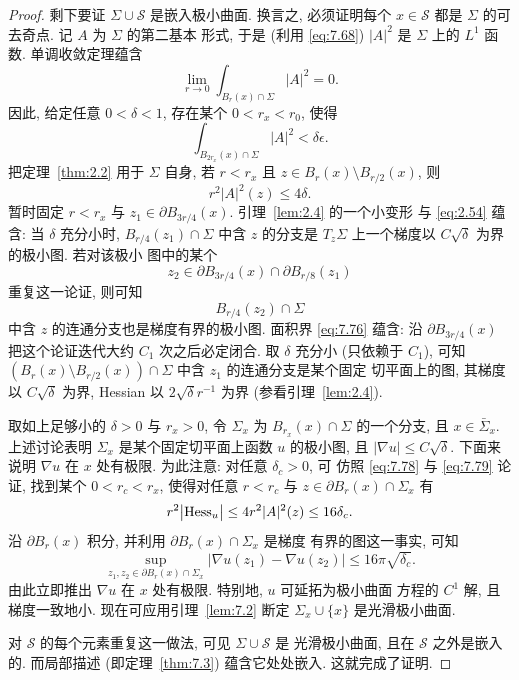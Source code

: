 \begin{proof}
剩下要证 $\Sigma\cup\mathcal{S}$ 是嵌入极小曲面. 换言之, 必须证明每个
$x\in\mathcal{S}$ 都是 $\Sigma$ 的可去奇点. 记 $A$ 为 $\Sigma$ 的第二基本
形式, 于是 (利用 \eqref{eq:7.68}) $|A|^2$ 是 $\Sigma$ 上的 $L^1$ 函数.
单调收敛定理蕴含
\begin{equation}
\lim_{r\to0}\int_{B_r(x)\cap\Sigma}|A|^2=0.
\label{eq:7.77}
\end{equation}
因此, 给定任意 $0<\delta<1$, 存在某个 $0<r_x<r_0$, 使得
\begin{equation}
\int_{B_{2r_x}(x)\cap\Sigma}|A|^2<\delta\epsilon.
\label{eq:7.78}
\end{equation}
把定理~\ref{thm:2.2} 用于 $\Sigma$ 自身, 若 $r<r_x$ 且
$z\in B_r(x)\setminus B_{r/2}(x)$, 则
\begin{equation}
r^2|A|^2(z)\leq4\delta.
\label{eq:7.79}
\end{equation}
暂时固定 $r<r_x$ 与 $z_1\in\partial B_{3r/4}(x)$. 引理~\ref{lem:2.4} 的一个小变形
与 \eqref{eq:2.54} 蕴含: 当 $\delta$ 充分小时, $B_{r/4}(z_1)\cap\Sigma$ 中含 $z$
的分支是 $T_z\Sigma$ 上一个梯度以 $C\sqrt\delta$ 为界的极小图. 若对该极小
图中的某个
\[
z_2\in\partial B_{3r/4}(x)\cap\partial B_{r/8}(z_1)
\]
重复这一论证, 则可知
\[
B_{r/4}(z_2)\cap\Sigma
\]
中含 $z$ 的连通分支也是梯度有界的极小图. 面积界 \eqref{eq:7.76} 蕴含:
沿 $\partial B_{3r/4}(x)$ 把这个论证迭代大约 $C_1$ 次之后必定闭合. 取
$\delta$ 充分小 (只依赖于 $C_1$), 可知
$(B_r(x)\setminus B_{r/2}(x))\cap\Sigma$ 中含 $z_1$ 的连通分支是某个固定
切平面上的图, 其梯度以 $C\sqrt\delta$ 为界, Hessian 以 $2\sqrt\delta r^{-1}$
为界 (参看引理~\ref{lem:2.4}).

取如上足够小的 $\delta>0$ 与 $r_x>0$, 令 $\Sigma_x$ 为
$B_{r_x}(x)\cap\Sigma$ 的一个分支, 且 $x\in\bar\Sigma_x$. 上述讨论表明
$\Sigma_x$ 是某个固定切平面上函数 $u$ 的极小图, 且 $|\nabla u|\leq C\sqrt\delta$.
下面来说明 $\nabla u$ 在 $x$ 处有极限. 为此注意: 对任意 $\delta_c>0$, 可
仿照 \eqref{eq:7.78} 与 \eqref{eq:7.79} 论证, 找到某个 $0<r_c<r_x$,
使得对任意 $r<r_c$ 与 $z\in\partial B_r(x)\cap\Sigma_x$ 有
\begin{equation}
r^2\bigl|\operatorname{Hess}_u\bigr|\leq4r^2|A|^2(z)\leq16\delta_c.
\label{eq:7.80}
\end{equation}
沿 $\partial B_r(x)$ 积分, 并利用 $\partial B_r(x)\cap\Sigma_x$ 是梯度
有界的图这一事实, 可知
\begin{equation}
\sup_{z_1,z_2\in\partial B_r(x)\cap\Sigma_x}
|\nabla u(z_1)-\nabla u(z_2)|\leq16\pi\sqrt{\delta_c}.
\label{eq:7.81}
\end{equation}
由此立即推出 $\nabla u$ 在 $x$ 处有极限. 特别地, $u$ 可延拓为极小曲面
方程的 $C^1$ 解, 且梯度一致地小. 现在可应用引理~\ref{lem:7.2} 断定
$\Sigma_x\cup\{x\}$ 是光滑极小曲面.

对 $\mathcal{S}$ 的每个元素重复这一做法, 可见 $\Sigma\cup\mathcal{S}$ 是
光滑极小曲面, 且在 $\mathcal{S}$ 之外是嵌入的. 而局部描述 (即定理~\ref{thm:7.3})
蕴含它处处嵌入. 这就完成了证明.
\end{proof}

